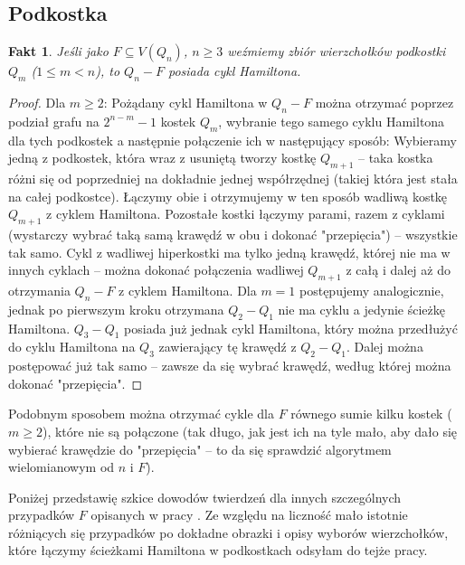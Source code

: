 \documentclass{pracamgr}
\newtheorem{fact}[theorem]{Fakt}
\begin{document}
   \subsection{Podkostka}
    \begin{fact}\label{hamilton dla F=Q_m}
     Jeśli jako $F\subseteq V(Q_n)$, $n\ge3$ weźmiemy zbiór wierzchołków podkostki $Q_m$ ($1\le m<n$), to $Q_n-F$ posiada cykl Hamiltona.
    \end{fact}
    \begin{proof}
     Dla $m\ge2$:\newline 
     Pożądany cykl Hamiltona w $Q_n-F$ można otrzymać poprzez podział grafu na $2^{n-m}-1$ kostek $Q_m$, wybranie tego samego cyklu Hamiltona dla tych podkostek
     a następnie połączenie ich w następujący sposób:\newline
     Wybieramy jedną z podkostek, która wraz z usuniętą tworzy kostkę $Q_{m+1}$ -- taka kostka różni się od poprzedniej na dokładnie jednej współrzędnej
     (takiej która jest stała na całej podkostce). Łączymy obie i otrzymujemy w ten sposób wadliwą kostkę $Q_{m+1}$ z cyklem Hamiltona.
     Pozostałe kostki łączymy parami, razem z cyklami (wystarczy wybrać taką samą krawędź w obu i dokonać "przepięcia") -- wszystkie tak samo.
     Cykl z wadliwej hiperkostki ma tylko jedną krawędź, której nie ma w innych cyklach -- można dokonać połączenia wadliwej $Q_{m+1}$ z całą i dalej aż
     do otrzymania $Q_n-F$ z cyklem Hamiltona.\newline
     Dla $m=1$ postępujemy analogicznie, jednak po pierwszym kroku otrzymana $Q_2-Q_1$ nie ma cyklu a jedynie ścieżkę Hamiltona. $Q_3-Q_1$
     posiada już jednak cykl Hamiltona, który można przedłużyć do cyklu Hamiltona na $Q_3$ zawierający tę krawędź z $Q_2-Q_1$.
     Dalej można postępować już tak samo -- zawsze da się wybrać krawędź, według której można dokonać "przepięcia".
    \end{proof}
    Podobnym sposobem można otrzymać cykle dla $F$ równego sumie kilku kostek ($m\ge2$), które nie są połączone (tak długo, jak jest ich na tyle mało,
    aby dało się wybierać krawędzie do "przepięcia" -- to da się sprawdzić algorytmem wielomianowym od $n$ i $F$).\newline
   
   Poniżej przedstawię szkice dowodów twierdzeń dla innych szczególnych przypadków $F$ opisanych w pracy \cite{Pegr}.
   Ze względu na liczność mało istotnie różniących się przypadków po dokładne obrazki i opisy wyborów wierzchołków,
   które łączymy ścieżkami Hamiltona w podkostkach odsyłam do tejże pracy.
\end{document}

